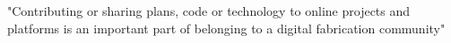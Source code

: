 "Contributing or sharing plans, code or technology to online projects and platforms is an important part of belonging to a digital fabrication community"